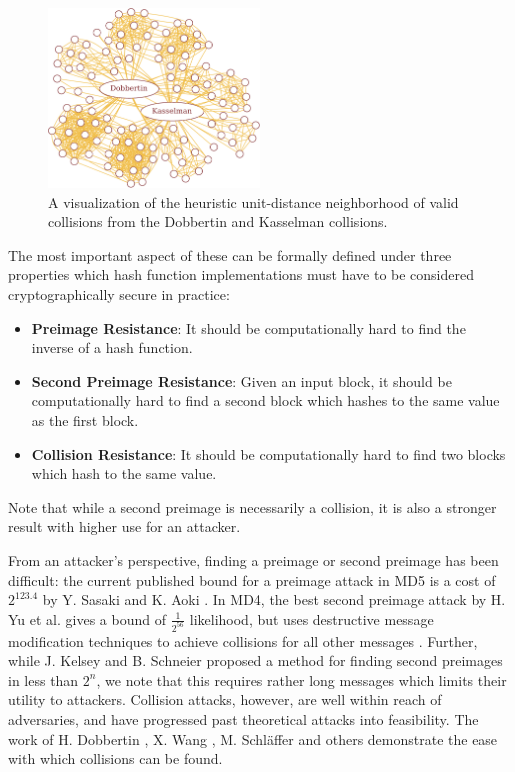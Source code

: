 \documentclass[conference]{IEEEtran}
\begin{document}
\begin{figure}
\begin{center}
\includegraphics[width=0.5\textwidth]{Figs/graph-intro-crop.pdf}
\caption{A visualization of the heuristic unit-distance neighborhood
  of valid collisions from the Dobbertin and Kasselman collisions.}
\label{Fig:Graph-Intro}
\end{center}
\end{figure}

The most important aspect of these can be formally defined under three
properties which hash function implementations must have to be
considered cryptographically secure in practice:
\begin{itemize}
    \item \textbf{Preimage Resistance}: It should be computationally hard to find
        the inverse of a hash function.
    \item \textbf{Second Preimage Resistance}: Given an input block, it should be
        computationally hard to find a second block which hashes to the
        same value as the first block.
    \item \textbf{Collision Resistance}: It should be computationally hard to find two
        blocks which hash to the same value.
\end{itemize}
Note that while a second preimage is necessarily a collision, it is also a
stronger result with higher use for an attacker.

From an attacker's perspective, finding a preimage or second preimage has been
difficult: the current published bound for a preimage attack in MD5 is a cost
of $2^{123.4}$ by Y. Sasaki and K. Aoki \cite{SasakiPreimage}. In MD4, the
best second preimage attack by H. Yu et al. gives a bound of $\frac{1}{2^{56}}$
likelihood, but uses destructive message modification techniques to achieve
collisions for all other messages \cite{cryptoeprint:2007:206}. Further, while
J. Kelsey and B. Schneier proposed a method for finding second preimages
in less than $2^n$, we note that this requires rather long messages
\cite{SchneierSecondPreimage} which limits their utility to
attackers. Collision attacks, however, are well within reach
of adversaries, and have progressed past theoretical attacks into feasibility. The work of
H. Dobbertin \cite{Dobbertin1998}, X. Wang \cite{cryptoeprint:2004:199},
M. Schl{\"a}ffer \cite{Schlaffer2006} and others demonstrate the ease with which
collisions can be found.
\end{document}
